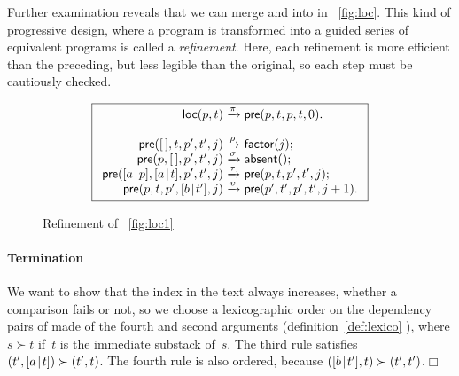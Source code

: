 Further examination reveals that we can merge
 and
 into
 in \fig~\vref{fig:loc}. This kind of progressive
design, where a program is transformed into a guided series of
equivalent programs is called a \emph{refinement}. Here, each
refinement is more efficient than the preceding, but less legible than
the original, so each step must be cautiously checked.
\begin{figure}[h]
\begin{equation*}
\boxed{%
\begin{array}{r@{\;}l@{\;}l}
\fun{loc}(p,t)   & \xrightarrow{\smash{\pi}} & \fun{pre}(p,t,p,t,0).\\
\\
\fun{pre}(\el,t,p',t',j) & \xrightarrow{\smash{\rho}}
                         & \fun{factor}(j);\\
\fun{pre}(p,\el,p',t',j) & \xrightarrow{\smash{\sigma}}
                         & \fun{absent}();\\
\fun{pre}(\cons{a}{p},\cons{a}{t},p',t',j)
                         & \xrightarrow{\smash{\tau}}
                         & \fun{pre}(p,t,p',t',j);\\
\fun{pre}(p,t,p',\cons{b}{t'},j) & \xrightarrow{\smash{\upsilon}}
                         & \fun{pre}(p',t',p',t',j+1).
\end{array}}
\end{equation*}
\caption{Refinement of \fig~\vref{fig:loc1}}
\label{fig:loc}
\end{figure}

\paragraph{Termination}

We want to show that the index in the text always increases, whether a
comparison fails or not, so we choose a lexicographic order on the
dependency pairs of 
made of the fourth and second arguments (definition~\eqref{def:lexico}
), where \(s \succ t\) if~\(t\) is the immediate
substack of~\(s\). The third rule satisfies \((t',[{a}\!\mid\!{t}]) \succ
(t',t)\). The fourth rule is also ordered, because \(([{b}\!\mid\!{t'}],t)
\succ (t',t')\).\hfill\(\Box\)

